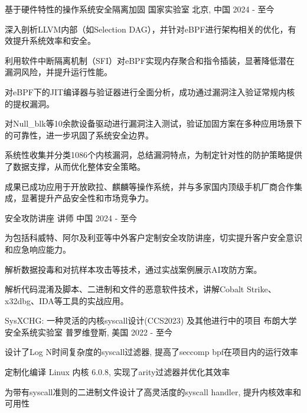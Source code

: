 \begin{cventries}
  \cventry
  {基于硬件特性的操作系统安全隔离加固}
  {国家实验室}
  {北京, 中国}
  {2024 - 至今}
  {
    \begin{cvitems}
      \item {深入剖析LLVM内部（如Selection DAG），并针对eBPF进行架构相关的优化，有效提升系统效率和安全。}
      \item {利用软件中断隔离机制（SFI）对eBPF实现内存聚合和指令插装，显著降低潜在漏洞风险，并提升运行性能。}
      \item {对eBPF下的JIT编译器与验证器进行全面分析，成功通过漏洞注入验证常规内核的提权漏洞。}
      \item {对Null\_blk等10余款设备驱动进行漏洞注入测试，验证加固方案在多种应用场景下的可靠性，进一步巩固了系统安全边界。}
      \item {系统性收集并分类1086个内核漏洞，总结漏洞特点，为制定针对性的防护策略提供了数据支撑，从而优化整体安全策略。}
      \item {成果已成功应用于开放欧拉、麒麟等操作系统，并与多家国内顶级手机厂商合作集成，显著提升产品安全性和市场竞争力。}
    \end{cvitems}
  }

\cventry
  {安全攻防讲座}
  {讲师}
  {中国}
  {2024 - 至今}
  {
    \begin{cvitems}
      \item {为包括科威特、阿尔及利亚等中外客户定制安全攻防讲座，切实提升客户安全意识和应急响应能力。}
      \item {解析数据投毒和对抗样本攻击等技术，通过实战案例展示AI攻防方案。}
      \item {解析代码混淆及脚本、二进制和文件的恶意软件技术，讲解Cobalt Strike、x32dbg、IDA等工具的实战应用。}
    \end{cvitems}
  }

  \cventry
    {SysXCHG: 一种灵活的内核syscall设计(CCS2023) 及其他进行中的项目}
    {布朗大学安全系统实验室}
    {普罗维登斯, 美国}
    {2022 - 至今}
    {
      \begin{cvitems}
        \item {设计了Log N时间复杂度的syscall过滤器, 提高了seccomp bpf在项目内的运行效率}
        \item {定制化编译 Linux 内核 6.0.8, 实现了arity过滤器并优化其效率}
        \item {为带有syscall准则的二进制文件设计了高灵活度的syscall handler, 提升内核效率和可用性}      
      \end{cvitems}
    }


\end{cventries}
